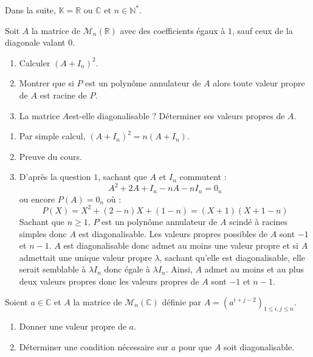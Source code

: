 \documentclass[a4paper,10pt]{report}
\begin{document}
\everymath{\displaystyle}


\begin{center}
\end{center}

\bigskip

\noindent Dans la suite, $\mathbb{K} = \mathbb{R}$ ou $\mathbb{C}$ et $n \in \mathbb{N}^*$.

\medskip

\begin{Exercice}{} Soit $A$ la matrice de $\mathcal{M}_n(\mathbb{R})$ avec des coefficients égaux à $1$, sauf ceux de la diagonale valant $0$.

\begin{enumerate}
\item Calculer $(A+I_n)^2$.
\item Montrer que si $P$ est un polynôme annulateur de $A$ alors toute valeur propre de $A$ est racine de $P$.
\item La matrice $A$est-elle diagonalisable ? Déterminer ses valeurs propres de $A$. 
\end{enumerate}
\end{Exercice}

\corr 
\begin{enumerate}
\item Par simple calcul, $(A+I_n)^2 = n (A+I_n)$.
\item Preuve du cours.
\item D'après la question $1$, sachant que $A$ et $I_n$ commutent :
$$ A^2 +2A+I_n -nA-nI_n=0_n$$
ou encore $P(A)=0_n$ où :
$$ P(X)=X^2+(2-n)X+(1-n) = (X+1)(X+1-n)$$
Sachant que $n \geq 1$, $P$ est un polynôme annulateur de $A$ scindé à racines simples donc $A$ est diagonalisable. Les valeurs propres possibles de $A$ sont $-1$ et $n-1$. $A$ est diagonalisable donc admet au moins une valeur propre et si $A$ admettait une unique valeur propre $\lambda$, sachant qu'elle est diagonalisable, elle serait semblable à $\lambda I_n$ donc égale à $\lambda I_n$. Ainsi, $A$ admet au moins et au plus deux valeurs propres donc les valeurs propres de $A$ sont $-1$ et $n-1$.
\end{enumerate}

\begin{Exercice}{} Soient $a \in \mathbb{C}$ et $A$ la matrice de $\mathcal{M}_n(\mathbb{C})$ définie par $A=( a^{i+j-2})_{1 \leq i,j \leq n}$.

\begin{enumerate}
\item Donner une valeur propre de $a$.
\item Déterminer une condition nécessaire sur $a$ pour que $A$ soit diagonalisable.
\end{enumerate}
\end{Exercice}
\end{document}
